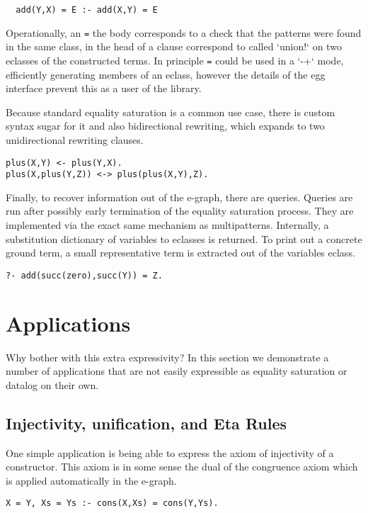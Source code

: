 \documentclass[sigplan,10pt,review,anonymous]{acmart}
\begin{document}
\begin{lstlisting}
  add(Y,X) = E :- add(X,Y) = E
\end{lstlisting}

Operationally, an \lstinline{=} the body corresponds to a check that the patterns were found in the same class,
in the head of a clause correspond to called `union!` on two eclasses of the constructed terms. In principle \lstinline{=} could be used in a `-+` mode, efficiently generating members of an eclass, however the details of the egg interface prevent this as a user of the library.

Because standard equality saturation is a common use case, there is custom syntax sugar for it and also bidirectional rewriting, which expands to two unidirectional rewriting clauses.

\begin{lstlisting}
plus(X,Y) <- plus(Y,X).
plus(X,plus(Y,Z)) <-> plus(plus(X,Y),Z).
\end{lstlisting}

Finally, to recover information out of the e-graph, there are queries. Queries are run after possibly early termination of the equality saturation process. They are implemented via the exact same mechanism as multipatterns. Internally, a substitution dictionary of variables to eclasses is returned. To print out a concrete ground term, a small representative term is extracted out of the variables eclass.

\begin{lstlisting}
?- add(succ(zero),succ(Y)) = Z.
\end{lstlisting}

\section{Applications}
Why bother with this extra expressivity? In this section we demonstrate a number of applications that are not easily expressible as equality saturation or datalog on their own.

\subsection{Injectivity, unification, and Eta Rules}
One simple application is being able to express the axiom of injectivity of a constructor. This axiom is in some sense the dual of the congruence axiom which is applied automatically in the e-graph.

\begin{lstlisting}
X = Y, Xs = Ys :- cons(X,Xs) = cons(Y,Ys).
\end{lstlisting}
\end{document}
